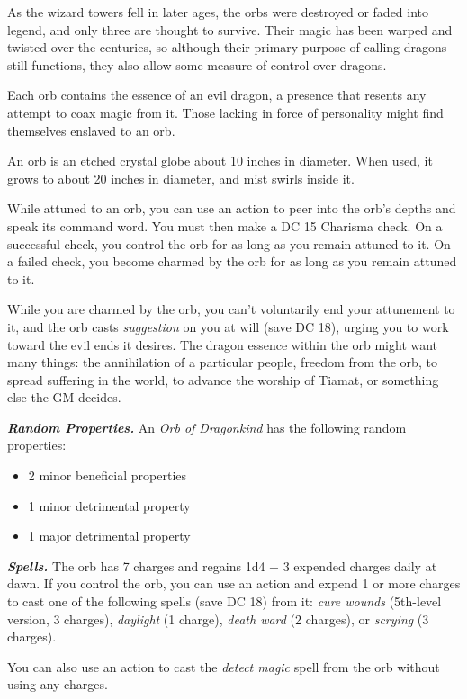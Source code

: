 \documentclass[
]{article}
\providecommand{\tightlist}{%
  \setlength{\itemsep}{0pt}\setlength{\parskip}{0pt}}
\begin{document}
As the wizard towers fell in later ages, the orbs were destroyed or
faded into legend, and only three are thought to survive. Their magic
has been warped and twisted over the centuries, so although their
primary purpose of calling dragons still functions, they also allow some
measure of control over dragons.

Each orb contains the essence of an evil dragon, a presence that resents
any attempt to coax magic from it. Those lacking in force of personality
might find themselves enslaved to an orb.

An orb is an etched crystal globe about 10 inches in diameter. When
used, it grows to about 20 inches in diameter, and mist swirls inside
it.

While attuned to an orb, you can use an action to peer into the orb's
depths and speak its command word. You must then make a DC 15 Charisma
check. On a successful check, you control the orb for as long as you
remain attuned to it. On a failed check, you become charmed by the orb
for as long as you remain attuned to it.

While you are charmed by the orb, you can't voluntarily end your
attunement to it, and the orb casts \emph{suggestion} on you at will
(save DC 18), urging you to work toward the evil ends it desires. The
dragon essence within the orb might want many things: the annihilation
of a particular people, freedom from the orb, to spread suffering in the
world, to advance the worship of Tiamat, or something else the GM
decides.

\emph{\textbf{Random Properties.}} An \emph{Orb of Dragonkind} has the
following random properties:

\begin{itemize}
\tightlist
\item
  2 minor beneficial properties
\item
  1 minor detrimental property
\item
  1 major detrimental property
\end{itemize}

\emph{\textbf{Spells.}} The orb has 7 charges and regains 1d4 + 3
expended charges daily at dawn. If you control the orb, you can use an
action and expend 1 or more charges to cast one of the following spells
(save DC 18) from it: \emph{cure wounds} (5th-level version, 3 charges),
\emph{daylight} (1 charge), \emph{death ward} (2 charges), or
\emph{scrying} (3 charges).

You can also use an action to cast the \emph{detect magic} spell from
the orb without using any charges.
\end{document}

